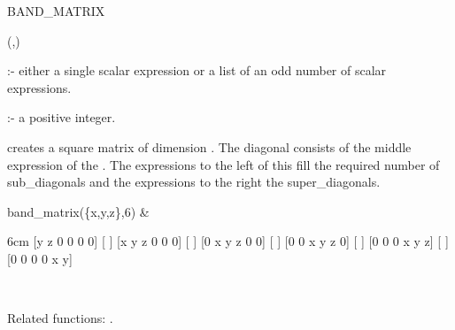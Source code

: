 \begin{Operator}[bandmatrix]{BAND_MATRIX}

\begin{Syntax}
(,)
\end{Syntax}

   :- either a single scalar expression or a list of 
                       an odd number of scalar expressions.

 :- a positive integer.

 creates a square matrix of dimension
. The diagonal consists of the middle expression
of the . The expressions to the left of this fill
the required number of sub\_diagonals and the expressions to the right 
the super\_diagonals. 

\begin{Examples}

band_matrix(\{x,y,z\},6) & 
\begin{multilineoutput}{6cm}
[y  z  0  0  0  0]
[                ]
[x  y  z  0  0  0]
[                ]
[0  x  y  z  0  0]
[                ]
[0  0  x  y  z  0]
[                ]
[0  0  0  x  y  z]
[                ]
[0  0  0  0  x  y]
\end{multilineoutput} \\
\end{Examples}

Related functions: .

\end{Operator}


